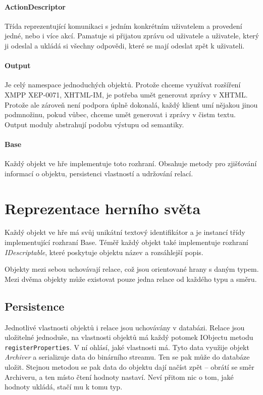 \documentclass[11pt, a4paper]{article}
\def\class#1{\emph{#1}}
\begin{document}
\paragraph{ActionDescriptor} Třída reprezentující komunikaci s jedním konkrétním uživatelem a provedení jedné, nebo i více akcí. Pamatuje si přijatou zprávu od uživatele a uživatele, který ji odeslal a ukládá si všechny odpovědi, které se mají odeslat zpět k uživateli.

\paragraph{Output} Je celý namespace jednoduchých objektů. Protože chceme využívat rozšíření XMPP XEP-0071, XHTML-IM, je potřeba umět generovat zprávy v XHTML. Protože ale zároveň není podpora úplně dokonalá, každý klient umí nějakou jinou podmnožinu, pokud vůbec, chceme umět generovat i zprávy v čistm textu. Output moduly abstrahují podobu výstupu od semantiky.

\paragraph{Base} Každý objekt ve hře implementuje toto rozhraní. Obsahuje metody pro zjišťování informací o objektu, persistenci vlastností a udržování relací.

\section{Reprezentace herního světa}

Každý objekt ve hře má svůj unikátní textový identifikátor a je instancí třídy implementující rozhraní Base. Téměř každý objekt také implementuje rozhraní \class{IDescriptable}, které poskytuje objektu název a rozsáhlejší popis. 

Objekty mezi sebou uchovávají relace, což jsou orientované hrany s daným typem. Mezi dvěma objekty může existovat pouze jedna relace od každého typu a směru.

\subsection{Persistence}

Jednotlivé vlastnosti objektů i relace jsou uchovávány v databázi. Relace jsou uložitelné jednoduše, na vlastnosti objektů má každý potomek IObjectu metodu \texttt{registerProperties}. V ní ohlásí, jaké vlastnosti má. Tyto data využije objekt \class{Archiver} a serializuje data do binárního streamu. Ten se pak může do databáze uložit. Stejnou metodou se pak data do objektu dají načíst zpět -- obrátí se směr Archiveru, a ten místo čtení hodnoty nastaví. Neví přitom nic o tom, jaké hodnoty ukládá, stačí mu k tomu typ.
\end{document}
